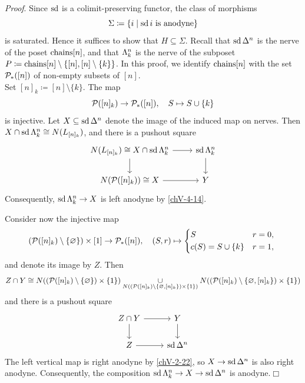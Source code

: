         \emph{Proof}. Since $\operatorname{sd}$ is a colimit-preserving functor, the class of morphisms
        \begin{equation*}
            \Sigma \coloneq \{ i \mid \operatorname{sd} i \text{ is anodyne} \}
        \end{equation*}
        is saturated. Hence it suffices to show that $H \subseteq \Sigma$. Recall that $\operatorname{sd} \Delta^n$ is the nerve of the poset $\operatorname{chains}[n]$, and that $\Lambda^{n}_{k}$ is the nerve of the subposet $P \coloneq \operatorname{chains}[n] \setminus \{ [n], [n] \setminus \{k\} \}$. In this proof, we identify $\operatorname{chains}[n]$ with the set $\mathcal{P}_{*}([n])$ of non-empty subsets of $[n]$.\\
        Set $[n]_k \coloneq [n] \setminus \{k\}$. The map
        \begin{equation*}
            \mathcal{P}([n]_k) \to \mathcal{P}_{*}([n]), \quad S \mapsto S \cup \{ k \}
        \end{equation*}
        is injective. Let $X \subseteq \operatorname{sd} \Delta^n$ denote the image of the induced map on nerves. Then $X \cap \operatorname{sd} \Lambda^{n}_{k} \cong N(L_{[n]_k})$, and there is a pushout square
        \begin{equation*}
            \begin{tikzcd}
                N(L_{[n]_k}) \cong X \cap \sd \horn{n}{k} \arrow[d] \arrow[r] & \sd \horn{n}{k} \arrow[d] \\
                N(\Pp([n]_k)) \cong X \arrow[r] & Y
            \end{tikzcd}
        \end{equation*}
        Consequently, $\operatorname{sd} \Lambda^{n}_{k} \to X$ is left anodyne by \ref{chV-4-14}.

        Consider now the injective map
        \begin{equation*}
            (\Pp([n]_k) \setminus \{\varnothing\}) \times [1] \to \Pp_{*}([n]), \quad (S, r) \mapsto
            \begin{cases*}
                S & $r = 0$,\\
                c(S) = S \cup \{k\} & $r = 1$,
            \end{cases*}
        \end{equation*}
        and denote its image by $Z$. Then
        \begin{equation*}
            Z \cap Y \cong N((\mathcal{P}([n]_k) \setminus \{\varnothing\}) \times \{1\}) \underset{N((\mathcal{P}([n]_k) \setminus \{\varnothing, [n]_k\}) \times \{1\})}{\cup} N((\mathcal{P}([n]_k) \setminus \{\varnothing, [n]_k\}) \times \{1\})
        \end{equation*}
        and there is a pushout square
        \begin{equation*}
            \begin{tikzcd}
                Z \cap Y \arrow[d] \arrow[r] & Y \arrow[d] \\
                Z \arrow[r] & \sd \Delta^n
            \end{tikzcd}
        \end{equation*}
        The left vertical map is right anodyne by \ref{chV-2-22}, so $X \to \operatorname{sd} \Delta^n$ is also right anodyne. Consequently, the composition $\operatorname{sd} \Lambda^{n}_{k} \to X \to \operatorname{sd} \Delta^n$ is anodyne.\hfill$\Box$

